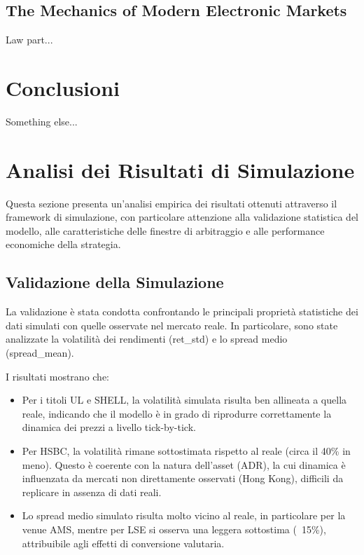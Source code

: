 \documentclass[10pt,final]{article}
\begin{document}
\subsection{The Mechanics of Modern Electronic Markets}

Law part...

\section{Conclusioni}

Something else...

\section{Analisi dei Risultati di Simulazione}

Questa sezione presenta un'analisi empirica dei risultati ottenuti attraverso il framework di simulazione, con particolare attenzione alla validazione statistica del modello, alle caratteristiche delle finestre di arbitraggio e alle performance economiche della strategia.

\subsection{Validazione della Simulazione}

La validazione è stata condotta confrontando le principali proprietà statistiche dei dati simulati con quelle osservate nel mercato reale. In particolare, sono state analizzate la volatilità dei rendimenti (ret\_std) e lo spread medio (spread\_mean).

I risultati mostrano che:

\begin{itemize}
    \item Per i titoli UL e SHELL, la volatilità simulata risulta ben allineata a quella reale, indicando che il modello è in grado di riprodurre correttamente la dinamica dei prezzi a livello tick-by-tick.
    \item Per HSBC, la volatilità rimane sottostimata rispetto al reale (circa il 40\% in meno). Questo è coerente con la natura dell'asset (ADR), la cui dinamica è influenzata da mercati non direttamente osservati (Hong Kong), difficili da replicare in assenza di dati reali.
    \item Lo spread medio simulato risulta molto vicino al reale, in particolare per la venue AMS, mentre per LSE si osserva una leggera sottostima (~15\%), attribuibile agli effetti di conversione valutaria.
\end{itemize}
\end{document}
